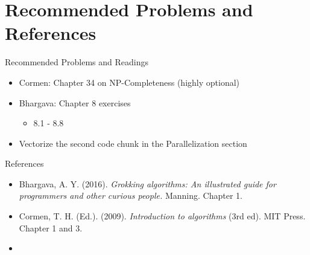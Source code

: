 \documentclass[
  ignorenonframetext,
]{beamer}
\providecommand{\tightlist}{%
  \setlength{\itemsep}{0pt}\setlength{\parskip}{0pt}}\usepackage{longtable,booktabs,array}
\begin{document}
\hypertarget{recommended-problems-and-references}{%
\section{Recommended Problems and
References}\label{recommended-problems-and-references}}

\begin{frame}{Recommended Problems and Readings}
\protect\hypertarget{recommended-problems-and-readings}{}
\begin{itemize}
\item
  Cormen: Chapter 34 on NP-Completeness (highly optional)
\item
  Bhargava: Chapter 8 exercises

  \begin{itemize}
  \tightlist
  \item
    8.1 - 8.8
  \end{itemize}
\item
  Vectorize the second code chunk in the Parallelization section
\end{itemize}
\end{frame}

\begin{frame}{References}
\protect\hypertarget{references}{}
\begin{itemize}
\item
  Bhargava, A. Y. (2016). \emph{Grokking algorithms: An illustrated
  guide for programmers and other curious people.} Manning. Chapter 1.
\item
  Cormen, T. H. (Ed.). (2009). \emph{Introduction to algorithms} (3rd
  ed). MIT Press. Chapter 1 and 3.
\item
\end{itemize}
\end{frame}
\end{document}
